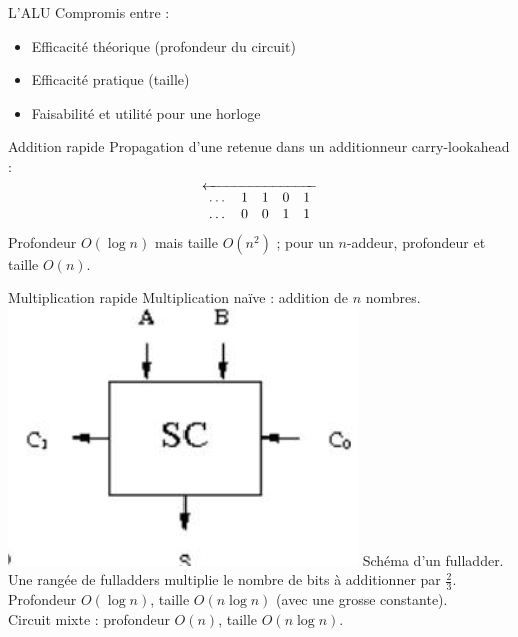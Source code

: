 \documentclass[12pt]{beamer}
\begin{document}
\begin{frame}{L'ALU}
	Compromis entre :
	\begin{itemize}
	\item Efficacité théorique  (profondeur du circuit)
	\item Efficacité pratique (taille)
	\item Faisabilité et utilité pour une horloge
	\end{itemize}
\end{frame}

\begin{frame}{Addition rapide}
	Propagation d'une retenue dans un additionneur carry-lookahead :
	$$\overleftarrow{
	\begin{array}{c c c c c}
	\dots & 1 & 1 & 0 & 1 \\
	\dots & 0 & 0 & 1 & 1 
	\end{array}}$$
	Profondeur $O(\log n)$ mais taille $O(n^2)$ ; pour un $n$-addeur, profondeur et taille $O(n)$.
\end{frame}

\begin{frame}{Multiplication rapide}
	Multiplication naïve : addition de $n$ nombres.\\
	\includegraphics{fulladder} Schéma d'un fulladder.\\
	Une rangée de fulladders multiplie le nombre de bits à additionner par $\frac{2}{3}$.\\
	Profondeur $O(\log n)$, taille $O(n \log n)$ (avec une grosse constante).\\
	Circuit mixte : profondeur $O(n)$, taille $O(n \log n)$.
\end{frame}
\end{document}
